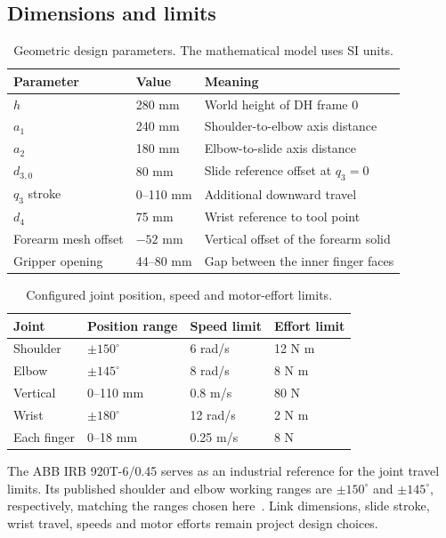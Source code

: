 \documentclass[11pt,a4paper]{article}
\begin{document}
\subsection{Dimensions and limits}
\begin{table}[htbp]\centering
\caption{Geometric design parameters. The mathematical model uses SI units.}\label{tab:geometry}
\begin{tabular}{@{}lll@{}}\toprule
Parameter & Value & Meaning\\\midrule
$h$ & 280 mm & World height of DH frame 0\\
$a_1$ & 240 mm & Shoulder-to-elbow axis distance\\
$a_2$ & 180 mm & Elbow-to-slide axis distance\\
$d_{3,0}$ & 80 mm & Slide reference offset at $q_3=0$\\
$q_3$ stroke & 0--110 mm & Additional downward travel\\
$d_4$ & 75 mm & Wrist reference to tool point\\
Forearm mesh offset & $-52$ mm & Vertical offset of the forearm solid\\
Gripper opening & 44--80 mm & Gap between the inner finger faces\\
\bottomrule\end{tabular}\end{table}

\begin{table}[htbp]\centering
\caption{Configured joint position, speed and motor-effort limits.}\label{tab:limits}
\begin{tabular}{@{}llll@{}}\toprule
Joint & Position range & Speed limit & Effort limit\\\midrule
Shoulder & $\pm150^\circ$ & 6 rad/s & 12 N m\\
Elbow & $\pm145^\circ$ & 8 rad/s & 8 N m\\
Vertical & 0--110 mm & 0.8 m/s & 80 N\\
Wrist & $\pm180^\circ$ & 12 rad/s & 2 N m\\
Each finger & 0--18 mm & 0.25 m/s & 8 N\\
\bottomrule\end{tabular}\end{table}

The ABB IRB 920T-6/0.45 serves as an industrial reference for the joint
travel limits. Its published shoulder and elbow working ranges are
$\pm150^\circ$ and $\pm145^\circ$, respectively, matching the ranges
chosen here~\cite{abb}. Link dimensions, slide stroke, wrist travel,
speeds and motor efforts remain project design choices.
\end{document}
